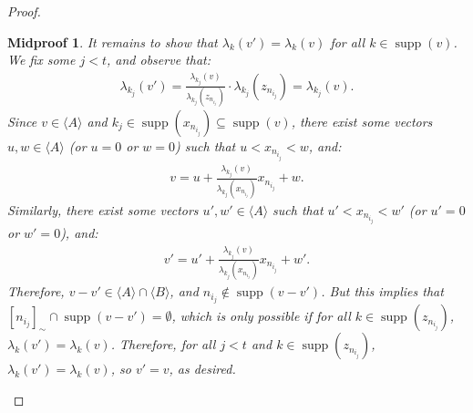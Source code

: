 \documentclass[10pt,a4paper]{amsart}
\newtheorem{midproof}{Midproof}
\renewcommand{\c}[1]{\langle #1 \rangle}
\newcommand{\func}{\operatorname}
\newcommand{\supp}{\func{supp}}
\begin{document}
\begin{proof}
\begin{midproof}
        It remains to show that $\lambda_k(v') = \lambda_k(v)$ for all $k \in \supp(v)$. We fix some $j < t$, and observe that:
        \begin{align*}
            \lambda_{k_j}(v') = \frac{\lambda_{k_j}(v)}{\lambda_{k_j}(z_{n_{i_j}})} \cdot \lambda_{k_j}(z_{n_{i_j}}) = \lambda_{k_j}(v).
        \end{align*}
        Since $v \in \c{A}$ and $k_j \in \supp(x_{n_{i_j}}) \subseteq \supp(v)$, there exist some vectors $u,w \in \c{A}$ (or $u = 0$ or $w = 0$) such that $u < x_{n_{i_j}} < w$, and:
        \begin{align*}
            v = u + \frac{\lambda_{k_j}(v)}{\lambda_{k_j}(x_{n_{i_j}})}x_{n_{i_j}} + w.
        \end{align*}
        Similarly, there exist some vectors $u',w' \in \c{A}$ such that $u' < x_{n_{i_j}} < w'$ (or $u' = 0$ or $w'      = 0$), and:
        \begin{align*}
            v' = u' + \frac{\lambda_{k_j}(v)}{\lambda_{k_j}(x_{n_{i_j}})}x_{n_{i_j}} + w'.
        \end{align*}
        Therefore, $v - v' \in \c{A} \cap \c{B}$, and $n_{i_j} \notin \supp(v - v')$. But this implies that $[n_{i_j}]_\sim \cap \supp(v - v') = \emptyset$, which is only possible if for all $k \in \supp(z_{n_{i_j}})$, $\lambda_k(v') = \lambda_k(v)$. Therefore, for all $j < t$ and $k \in \supp(z_{n_{i_j}})$, $\lambda_k(v') = \lambda_k(v)$, so $v' = v$, as desired.
    \end{midproof}
\end{proof}
\end{document}
